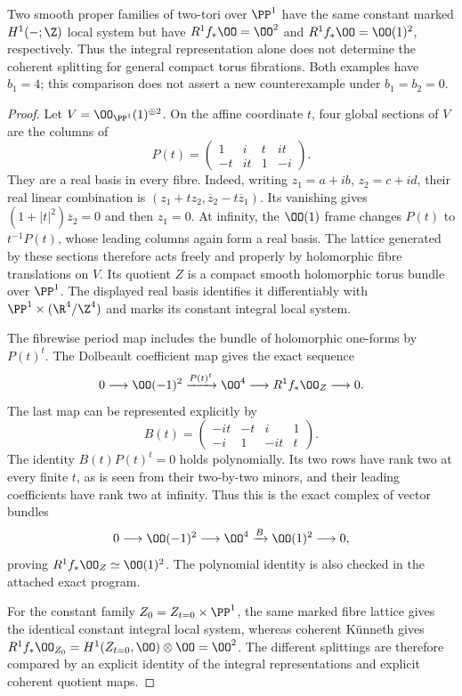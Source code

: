 \begin{example}
\label{st:D.1.15}
Two smooth proper families of two-tori over $\PP^1$ have the same
constant marked $H^1(-;\Z)$ local system but have
$R^1f_*\OO=\OO^2$ and $R^1f_*\OO=\OO(1)^2$, respectively.
Thus the integral representation alone does not determine the
coherent splitting for general compact torus fibrations. Both
examples have $b_1=4$; this comparison does not assert a new
counterexample under $b_1=b_2=0$.
\end{example}
\begin{proof}
Let $V=\OO_{\PP^1}(1)^{\oplus2}$. On the affine coordinate $t$,
four global sections of $V$ are the columns of
\[
P(t)=\begin{pmatrix}1&i&t&it\\-t&it&1&-i\end{pmatrix}.
\]
They are a real basis in every fibre. Indeed, writing
$z_1=a+ib$, $z_2=c+id$, their real linear combination is
$(z_1+t z_2,\overline z_2-t\overline z_1)$.
Its vanishing gives $(1+|t|^2)\overline z_2=0$ and then $z_1=0$.
At infinity, the $\OO(1)$ frame changes $P(t)$ to $t^{-1}P(t)$,
whose leading columns again form a real basis. The lattice
generated by these sections therefore acts freely and properly by
holomorphic fibre translations on $V$. Its quotient $Z$ is a
compact smooth holomorphic torus bundle over $\PP^1$.
The displayed real basis identifies it differentiably with
$\PP^1\times(\R^4/\Z^4)$ and marks its constant integral local
system.

The fibrewise period map includes the bundle of holomorphic
one-forms by $P(t)^t$. The Dolbeault coefficient map gives the
exact sequence
\[
0\longrightarrow\OO(-1)^2
 \xrightarrow{P(t)^t}\OO^4
 \longrightarrow R^1f_*\OO_Z\longrightarrow0.
\]
The last map can be represented explicitly by
\[
B(t)=\begin{pmatrix}-it&-t&i&1\\-i&1&-it&t\end{pmatrix}.
\]
The identity $B(t)P(t)^t=0$ holds polynomially. Its two rows have
rank two at every finite $t$, as is seen from their two-by-two
minors, and their leading coefficients have rank two at infinity.
Thus this is the exact complex of vector bundles
\[
0\longrightarrow\OO(-1)^2\longrightarrow\OO^4
 \xrightarrow{B}\OO(1)^2\longrightarrow0,
\]
proving $R^1f_*\OO_Z\simeq\OO(1)^2$. The polynomial identity is
also checked in the attached exact program.

For the constant family $Z_0=Z_{t=0}\times\PP^1$, the same
marked fibre lattice gives the identical constant integral local
system, whereas coherent K\"unneth gives
$R^1f_*\OO_{Z_0}=H^1(Z_{t=0},\OO)\otimes\OO=\OO^2$.
The different splittings are therefore compared by an explicit
identity of the integral representations and explicit coherent
quotient maps.
\end{proof}

